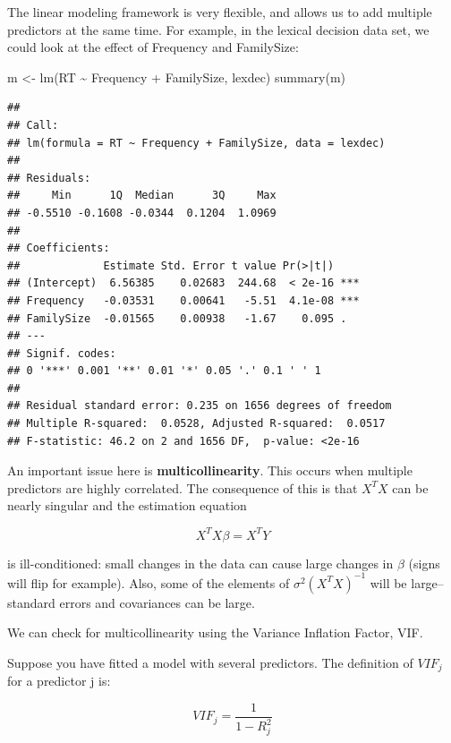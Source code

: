 \documentclass[
  12pt,
]{krantz}
\newenvironment{Shaded}{\begin{snugshade}}{\end{snugshade}}
\newcommand{\FunctionTok}[1]{\textcolor[rgb]{0.00,0.00,0.00}{#1}}
\newcommand{\NormalTok}[1]{#1}
\newcommand{\OtherTok}[1]{\textcolor[rgb]{0.56,0.35,0.01}{#1}}
\newcommand{\SpecialCharTok}[1]{\textcolor[rgb]{0.00,0.00,0.00}{#1}}
\theoremstyle{definition}
\theoremstyle{definition}
\theoremstyle{definition}
\theoremstyle{definition}
\theoremstyle{remark}
\begin{document}
The linear modeling framework is very flexible, and allows us to add multiple predictors at the same time. For example, in the lexical decision data set, we could look at the effect of Frequency and FamilySize:

\begin{Shaded}
\begin{Highlighting}[]
\NormalTok{m }\OtherTok{\textless{}{-}} \FunctionTok{lm}\NormalTok{(RT }\SpecialCharTok{\textasciitilde{}}\NormalTok{ Frequency }\SpecialCharTok{+}\NormalTok{ FamilySize, lexdec)}
\FunctionTok{summary}\NormalTok{(m)}
\end{Highlighting}
\end{Shaded}

\begin{verbatim}
## 
## Call:
## lm(formula = RT ~ Frequency + FamilySize, data = lexdec)
## 
## Residuals:
##     Min      1Q  Median      3Q     Max 
## -0.5510 -0.1608 -0.0344  0.1204  1.0969 
## 
## Coefficients:
##             Estimate Std. Error t value Pr(>|t|)    
## (Intercept)  6.56385    0.02683  244.68  < 2e-16 ***
## Frequency   -0.03531    0.00641   -5.51  4.1e-08 ***
## FamilySize  -0.01565    0.00938   -1.67    0.095 .  
## ---
## Signif. codes:  
## 0 '***' 0.001 '**' 0.01 '*' 0.05 '.' 0.1 ' ' 1
## 
## Residual standard error: 0.235 on 1656 degrees of freedom
## Multiple R-squared:  0.0528, Adjusted R-squared:  0.0517 
## F-statistic: 46.2 on 2 and 1656 DF,  p-value: <2e-16
\end{verbatim}

An important issue here is \textbf{multicollinearity}. This occurs when multiple predictors are highly correlated. The consequence of this is that \(X^T X\) can be nearly singular and the estimation equation

\begin{equation}
X^TX \beta = X^T Y 
\end{equation}

is ill-conditioned: small changes in the data can cause large changes in \(\beta\) (signs will flip for example). Also, some of the elements of \(\sigma^2 (X^TX)^{-1}\) will be large--standard errors and covariances can be large.

We can check for multicollinearity using the Variance Inflation Factor, VIF.

Suppose you have fitted a model with several predictors.
The definition of \(VIF_j\) for a predictor j is:

\begin{equation}
VIF_j = \frac{1}{1-R_j^2}
\end{equation}
\end{document}
